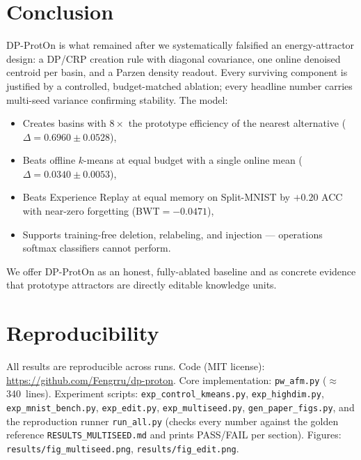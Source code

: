 \documentclass[11pt,a4paper]{article}
\begin{document}
\section{Conclusion}

DP-ProtOn is what remained after we systematically falsified an energy-attractor design: a DP/CRP creation rule with diagonal covariance, one online denoised centroid per basin, and a Parzen density readout. Every surviving component is justified by a controlled, budget-matched ablation; every headline number carries multi-seed variance confirming stability. The model:

\begin{itemize}[leftmargin=*]
\item Creates basins with $8\times$ the prototype efficiency of the nearest alternative ($\Delta=0.6960\pm0.0528$),
\item Beats offline $k$-means at equal budget with a single online mean ($\Delta=0.0340\pm0.0053$),
\item Beats Experience Replay at equal memory on Split-MNIST by $+0.20$ ACC with near-zero forgetting (BWT$=-0.0471$),
\item Supports training-free deletion, relabeling, and injection — operations softmax classifiers cannot perform.
\end{itemize}

We offer DP-ProtOn as an honest, fully-ablated baseline and as concrete evidence that prototype attractors are directly editable knowledge units.

\section*{Reproducibility}

All results are reproducible across runs.
Code (MIT license): \url{https://github.com/Fengrru/dp-proton}.
Core implementation: \texttt{pw\_afm.py} ($\approx$340~lines).
Experiment scripts:
\texttt{exp\_control\_kmeans.py},
\texttt{exp\_highdim.py},
\texttt{exp\_mnist\_bench.py},
\texttt{exp\_edit.py},
\texttt{exp\_multiseed.py},
\texttt{gen\_paper\_figs.py},
and the reproduction runner \texttt{run\_all.py} (checks every number
against the golden reference \texttt{RESULTS\_MULTISEED.md} and prints
PASS/FAIL per section).
Figures: \texttt{results/fig\_multiseed.png}, \texttt{results/fig\_edit.png}.
\end{document}
